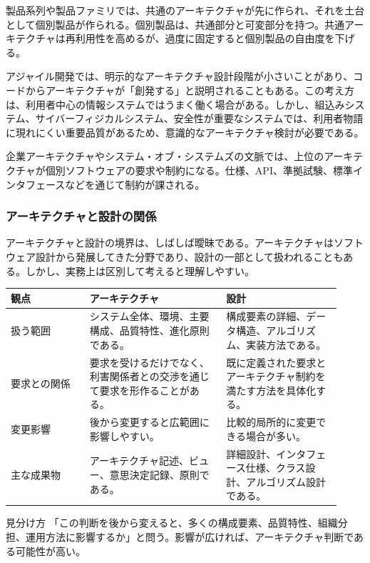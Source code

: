 \documentclass[a4paper,11pt]{ltjsarticle}
\begin{document}
製品系列や製品ファミリでは、共通のアーキテクチャが先に作られ、それを土台として個別製品が作られる。個別製品は、共通部分と可変部分を持つ。共通アーキテクチャは再利用性を高めるが、過度に固定すると個別製品の自由度を下げる。

アジャイル開発では、明示的なアーキテクチャ設計段階が小さいことがあり、コードからアーキテクチャが「創発する」と説明されることもある。この考え方は、利用者中心の情報システムではうまく働く場合がある。しかし、組込みシステム、サイバーフィジカルシステム、安全性が重要なシステムでは、利用者物語に現れにくい重要品質があるため、意識的なアーキテクチャ検討が必要である。

企業アーキテクチャやシステム・オブ・システムズの文脈では、上位のアーキテクチャが個別ソフトウェアの要求や制約になる。仕様、API、準拠試験、標準インタフェースなどを通じて制約が課される。

\subsubsection{アーキテクチャと設計の関係}
アーキテクチャと設計の境界は、しばしば曖昧である。アーキテクチャはソフトウェア設計から発展してきた分野であり、設計の一部として扱われることもある。しかし、実務上は区別して考えると理解しやすい。

\begin{longtable}{P{0.22\linewidth}P{0.38\linewidth}P{0.32\linewidth}}
\toprule
観点 & アーキテクチャ & 設計 \\
\midrule
扱う範囲 & システム全体、環境、主要構成、品質特性、進化原則である。 & 構成要素の詳細、データ構造、アルゴリズム、実装方法である。 \\
要求との関係 & 要求を受けるだけでなく、利害関係者との交渉を通じて要求を形作ることがある。 & 既に定義された要求とアーキテクチャ制約を満たす方法を具体化する。 \\
変更影響 & 後から変更すると広範囲に影響しやすい。 & 比較的局所的に変更できる場合が多い。 \\
主な成果物 & アーキテクチャ記述、ビュー、意思決定記録、原則である。 & 詳細設計、インタフェース仕様、クラス設計、アルゴリズム設計である。 \\
\bottomrule
\end{longtable}

\begin{statementbox}{見分け方}
「この判断を後から変えると、多くの構成要素、品質特性、組織分担、運用方法に影響するか」と問う。影響が広ければ、アーキテクチャ判断である可能性が高い。
\end{statementbox}
\end{document}
